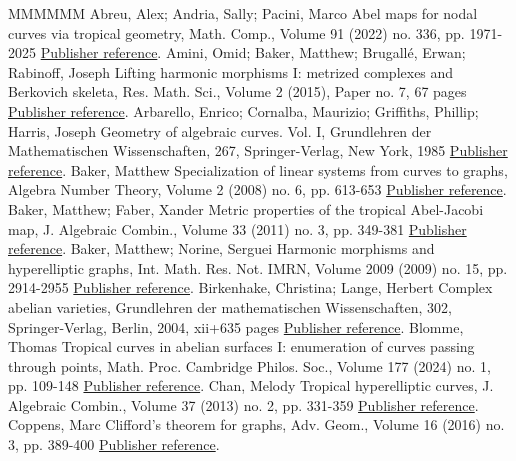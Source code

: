 \documentclass[11pt]{article}
\theoremstyle{definition}
\numberwithin{equation}{section}
\theoremstyle{definition}
\begin{document}
\begin{thebibliography}{MMMMMM}
 Abreu, Alex; Andria, Sally; Pacini, Marco Abel maps for nodal curves via tropical geometry, Math. Comp., Volume 91 (2022) no. 336, pp. 1971-2025 \href{https://alco.centre-mersenne.org/articles/10.5802/alco.452/#AbreuAndriaPacini_AbelMaps}{Publisher reference}.
 Amini, Omid; Baker, Matthew; Brugallé, Erwan; Rabinoff, Joseph Lifting harmonic morphisms I: metrized complexes and Berkovich skeleta, Res. Math. Sci., Volume 2 (2015), Paper no. 7, 67 pages \href{https://alco.centre-mersenne.org/articles/10.5802/alco.452/#ABBR}{Publisher reference}.
 Arbarello, Enrico; Cornalba, Maurizio; Griffiths, Phillip; Harris, Joseph Geometry of algebraic curves. Vol. I, Grundlehren der Mathematischen Wissenschaften, 267, Springer-Verlag, New York, 1985 \href{https://alco.centre-mersenne.org/articles/10.5802/alco.452/#ACGHI}{Publisher reference}.
 Baker, Matthew Specialization of linear systems from curves to graphs, Algebra Number Theory, Volume 2 (2008) no. 6, pp. 613-653 \href{https://alco.centre-mersenne.org/articles/10.5802/alco.452/#BC}{Publisher reference}.
 Baker, Matthew; Faber, Xander Metric properties of the tropical Abel-Jacobi map, J. Algebraic Combin., Volume 33 (2011) no. 3, pp. 349-381 \href{https://alco.centre-mersenne.org/articles/10.5802/alco.452/#BF11}{Publisher reference}.
 Baker, Matthew; Norine, Serguei Harmonic morphisms and hyperelliptic graphs, Int. Math. Res. Not. IMRN, Volume 2009 (2009) no. 15, pp. 2914-2955 \href{https://alco.centre-mersenne.org/articles/10.5802/alco.452/#BN09}{Publisher reference}.
 Birkenhake, Christina; Lange, Herbert Complex abelian varieties, Grundlehren der mathematischen Wissenschaften, 302, Springer-Verlag, Berlin, 2004, xii+635 pages \href{https://alco.centre-mersenne.org/articles/10.5802/alco.452/#BL04}{Publisher reference}.
 Blomme, Thomas Tropical curves in abelian surfaces I: enumeration of curves passing through points, Math. Proc. Cambridge Philos. Soc., Volume 177 (2024) no. 1, pp. 109-148 \href{https://alco.centre-mersenne.org/articles/10.5802/alco.452/#Blomme_CurvesInAbelian1}{Publisher reference}.
 Chan, Melody Tropical hyperelliptic curves, J. Algebraic Combin., Volume 37 (2013) no. 2, pp. 331-359 \href{https://alco.centre-mersenne.org/articles/10.5802/alco.452/#CH}{Publisher reference}.
 Coppens, Marc Clifford’s theorem for graphs, Adv. Geom., Volume 16 (2016) no. 3, pp. 389-400 \href{https://alco.centre-mersenne.org/articles/10.5802/alco.452/#Coppens_Clifford}{Publisher reference}.

\end{thebibliography}
\end{document}
